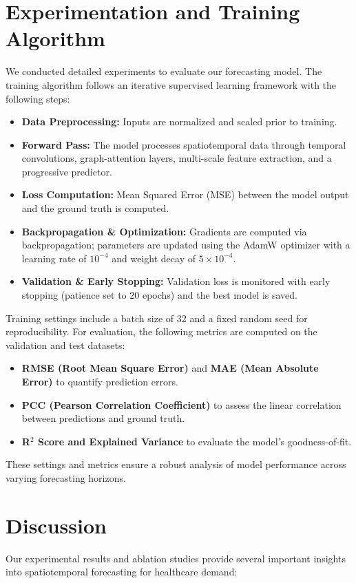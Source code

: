 \documentclass[lettersize, journal]{IEEEtran}
\begin{document}
\section{Experimentation and Training Algorithm}
We conducted detailed experiments to evaluate our forecasting model. The training algorithm follows an iterative supervised learning framework with the following steps:
\begin{itemize}
    \item \textbf{Data Preprocessing:} Inputs are normalized and scaled prior to training.
    \item \textbf{Forward Pass:} The model processes spatiotemporal data through temporal convolutions, graph-attention layers, multi-scale feature extraction, and a progressive predictor.
    \item \textbf{Loss Computation:} Mean Squared Error (MSE) between the model output and the ground truth is computed.
    \item \textbf{Backpropagation \& Optimization:} Gradients are computed via backpropagation; parameters are updated using the AdamW optimizer with a learning rate of $10^{-4}$ and weight decay of $5\times10^{-4}$.
    \item \textbf{Validation \& Early Stopping:} Validation loss is monitored with early stopping (patience set to 20 epochs) and the best model is saved.
\end{itemize}

Training settings include a batch size of 32 and a fixed random seed for reproducibility. For evaluation, the following metrics are computed on the validation and test datasets:
\begin{itemize}
    \item \textbf{RMSE (Root Mean Square Error)} and \textbf{MAE (Mean Absolute Error)} to quantify prediction errors.
    \item \textbf{PCC (Pearson Correlation Coefficient)} to assess the linear correlation between predictions and ground truth.
    \item \textbf{R$^2$ Score and Explained Variance} to evaluate the model's goodness-of-fit.
\end{itemize}

These settings and metrics ensure a robust analysis of model performance across varying forecasting horizons.

\section{Discussion}
Our experimental results and ablation studies provide several important insights into spatiotemporal forecasting for healthcare demand:
\end{document}
